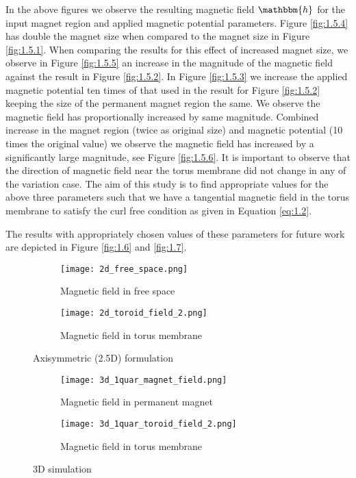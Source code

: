 In the above figures we observe the resulting magnetic field $\mathbbm{h}$ for the input magnet region and applied magnetic potential parameters. Figure \eqref{fig:1.5.4} has double the magnet size when compared to the magnet size in Figure \eqref{fig:1.5.1}. When comparing the results for this effect of increased magnet size, we observe in Figure \eqref{fig:1.5.5} an increase in the magnitude of the magnetic field against the result in Figure \eqref{fig:1.5.2}. In Figure \eqref{fig:1.5.3} we increase the applied magnetic potential ten times of that used in the result for Figure \eqref{fig:1.5.2} keeping the size of the permanent magnet region the same. We observe the magnetic field has proportionally increased by same magnitude. Combined increase in the magnet region (twice as original size) and magnetic potential (10 times the original value) we observe the magnetic field has increased by a significantly large magnitude, see Figure \eqref{fig:1.5.6}. It is important to observe that the direction of magnetic field near the torus membrane did not change in any of the variation case. The aim of this study is to find appropriate values for the above three parameters such that we have a tangential magnetic field in the torus membrane to satisfy the curl free condition as given in Equation \eqref{eq:1.2}. \par 

The results with appropriately chosen values of these parameters for future work are depicted in Figure \eqref{fig:1.6} and \eqref{fig:1.7}.

\begin{figure}[h]
\centering
\begin{subfigure}{0.49\textwidth}
\centering
\texttt{[image: 2d\_free\_space.png]}
\caption{Magnetic field in free space}
\label{fig:1.6.1}
\end{subfigure}
\begin{subfigure}{0.49\textwidth}
\centering
\texttt{[image: 2d\_toroid\_field\_2.png]}
\caption{Magnetic field in torus membrane}
\label{fig:1.6.2}
\end{subfigure}
\caption{Axisymmetric (2.5D) formulation}
\label{fig:1.6}
\end{figure}

\begin{figure}[h]
\centering
\begin{subfigure}{0.49\textwidth}
\centering
\texttt{[image: 3d\_1quar\_magnet\_field.png]}
\caption{Magnetic field in permanent magnet}
\label{fig:1.7.1}
\end{subfigure}
\begin{subfigure}{0.49\textwidth}
\centering
\texttt{[image: 3d\_1quar\_toroid\_field\_2.png]}
\caption{Magnetic field in torus membrane}
\label{fig:1.7.2}
\end{subfigure}
\caption{3D simulation}
\label{fig:1.7}
\end{figure}
